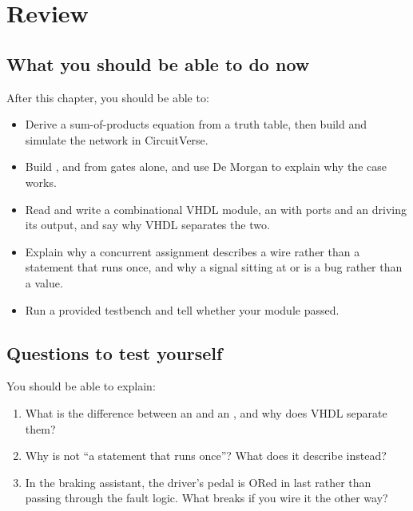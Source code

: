 
\section{Review}
\label{c1:sec:review}

\subsection*{What you should be able to do now}
After this chapter, you should be able to:
\begin{itemize}
  \item Derive a sum-of-products equation from a truth table, then build and simulate the network in
    CircuitVerse.
  \item Build ,  and  from  gates alone, and use De Morgan
    to explain why the  case works.
  \item Read and write a combinational VHDL module, an  with  ports and
    an  driving its output, and say why VHDL separates the two.
  \item Explain why a concurrent assignment describes a wire rather than a statement that runs once,
    and why a signal sitting at  or  is a bug rather than a value.
  \item Run a provided testbench and tell whether your module passed.
\end{itemize}

\subsection*{Questions to test yourself}
You should be able to explain:
\begin{enumerate}
  \item What is the difference between an  and an , and why does
    VHDL separate them?
  \item Why is  not ``a statement that runs once''? What does it describe
    instead?
  \item In the braking assistant, the driver's pedal is ORed in last rather than passing through
    the fault logic. What breaks if you wire it the other way?
\end{enumerate}

